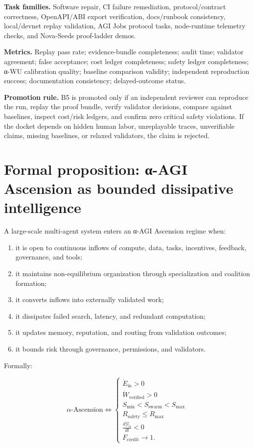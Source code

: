 \documentclass[
  11pt,
]{article}
\providecommand{\tightlist}{%
  \setlength{\itemsep}{0pt}\setlength{\parskip}{0pt}}
\begin{document}
\textbf{Task families.} Software repair, CI failure remediation,
protocol/contract correctness, OpenAPI/ABI export verification,
docs/runbook consistency, local/devnet replay validation, AGI Jobs
protocol tasks, node-runtime telemetry checks, and Nova-Seeds
proof-ladder demos.

\textbf{Metrics.} Replay pass rate; evidence-bundle completeness; audit
time; validator agreement; false acceptance; cost ledger completeness;
safety ledger completeness; α-WU calibration quality; baseline
comparison validity; independent reproduction success; documentation
consistency; delayed-outcome status.

\textbf{Promotion rule.} B5 is promoted only if an independent reviewer
can reproduce the run, replay the proof bundle, verify validator
decisions, compare against baselines, inspect cost/risk ledgers, and
confirm zero critical safety violations. If the docket depends on hidden
human labor, unreplayable traces, unverifiable claims, missing
baselines, or relaxed validators, the claim is rejected.

\section{Formal proposition: α-AGI Ascension as bounded dissipative
intelligence}\label{formal-proposition-ux3b1-agi-ascension-as-bounded-dissipative-intelligence}

A large-scale multi-agent system enters an α-AGI Ascension regime when:

\begin{enumerate}
\def\labelenumi{\arabic{enumi}.}
\tightlist
\item
  it is open to continuous inflows of compute, data, tasks, incentives,
  feedback, governance, and tools;
\item
  it maintains non-equilibrium organization through specialization and
  coalition formation;
\item
  it converts inflows into externally validated work;
\item
  it dissipates failed search, latency, and redundant computation;
\item
  it updates memory, reputation, and routing from validation outcomes;
\item
  it bounds risk through governance, permissions, and validators.
\end{enumerate}

Formally:

\[
\alpha\text{-Ascension}
\iff
\begin{cases}
\dot{E}_{\text{in}}>0 \\
\dot{W}_{\text{verified}}>0 \\
S_{\min}<S_{\text{swarm}}<S_{\max} \\
R_{\text{safety}}\leq R_{\max} \\
\frac{d\mathcal{G}_{\alpha}}{dt}<0 \\
F_{\text{credit}}\rightarrow 1.
\end{cases}
\]
\end{document}

